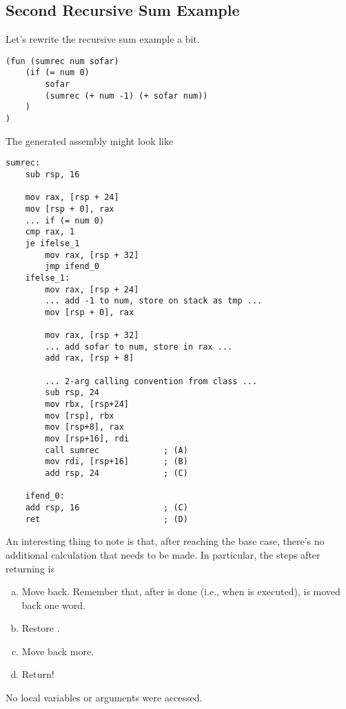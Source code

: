 \documentclass[letterpaper]{article}
\begin{document}
\subsection{Second Recursive Sum Example}
Let's rewrite the recursive sum example a bit.  
\begin{verbatim}
(fun (sumrec num sofar)
    (if (= num 0)
        sofar 
        (sumrec (+ num -1) (+ sofar num))
    )
)\end{verbatim}
The generated assembly might look like 
\begin{verbatim}
sumrec:
    sub rsp, 16
    
    mov rax, [rsp + 24]
    mov [rsp + 0], rax
    ... if (= num 0)  
    cmp rax, 1
    je ifelse_1
        mov rax, [rsp + 32]
        jmp ifend_0
    ifelse_1:
        mov rax, [rsp + 24]
        ... add -1 to num, store on stack as tmp ...
        mov [rsp + 0], rax

        mov rax, [rsp + 32]
        ... add sofar to num, store in rax ...
        add rax, [rsp + 8]
  
        ... 2-arg calling convention from class ...
        sub rsp, 24
        mov rbx, [rsp+24]
        mov [rsp], rbx
        mov [rsp+8], rax
        mov [rsp+16], rdi
        call sumrec             ; (A)
        mov rdi, [rsp+16]       ; (B)
        add rsp, 24             ; (C)
    
    ifend_0:
    add rsp, 16                 ; (C)
    ret                         ; (D)\end{verbatim}
An interesting thing to note is that, after reaching the base case, there's no additional calculation that needs to be made. In particular, the steps after returning is 
\begin{enumerate}[(a)]
    \item Move  back. Remember that, after  is done (i.e., when  is executed),  is moved back one word.
    \item Restore .
    \item Move  back more. 
    \item Return!
\end{enumerate}
No local variables or arguments were accessed.
\end{document}
